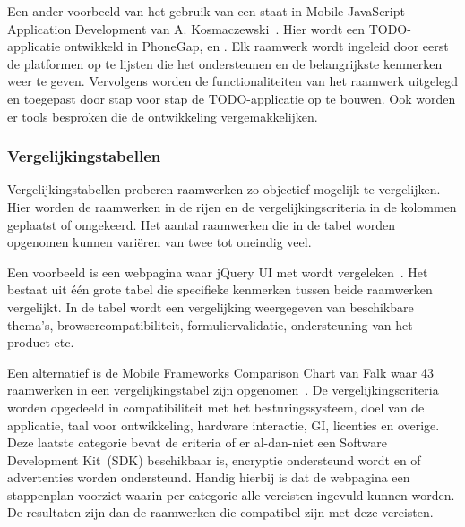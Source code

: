 Een ander voorbeeld van het gebruik van een  staat in Mobile JavaScript Application Development van A. Kosmaczewski~\cite{Kosmaczewski2012}.
Hier wordt een TODO-applicatie ontwikkeld in PhoneGap, \st{} en \jqm{}.
Elk raamwerk wordt ingeleid door eerst de platformen op te lijsten die het ondersteunen en de belangrijkste kenmerken weer te geven.
Vervolgens worden de functionaliteiten van het raamwerk uitgelegd en toegepast door stap voor stap de TODO-applicatie op te bouwen.
Ook worden er tools besproken die de ontwikkeling vergemakkelijken.

\subsubsection{Vergelijkingstabellen}
\label{sec:manier-vergelijkingstabellen}
Vergelijkingstabellen proberen raamwerken zo objectief mogelijk te vergelijken.
Hier worden de raamwerken in de rijen en de vergelijkingscriteria in de kolommen geplaatst of omgekeerd.
Het aantal raamwerken die in de tabel worden opgenomen kunnen variëren van twee tot oneindig veel.

Een voorbeeld is een webpagina waar jQuery UI met \kendo{} wordt vergeleken~\cite{Bristowe2012}.
Het bestaat uit één grote tabel die specifieke kenmerken tussen beide raamwerken vergelijkt.
In de tabel wordt een vergelijking weergegeven van beschikbare thema's,  browsercompatibiliteit,  formuliervalidatie,  ondersteuning van het product etc.

Een alternatief is de Mobile Frameworks Comparison Chart van Falk waar 43 raamwerken in een vergelijkingstabel zijn opgenomen~\cite{Falk2011}. 
De vergelijkingscriteria worden opgedeeld in compatibiliteit met het besturingssysteem,  doel van de applicatie,  taal voor ontwikkeling,  hardware interactie,  GI,  licenties en overige.  
Deze laatste categorie bevat de criteria of er al-dan-niet een Software Development Kit~(SDK) beschikbaar is, encryptie ondersteund wordt en of advertenties worden ondersteund.  
Handig hierbij is dat de webpagina een stappenplan voorziet waarin per categorie alle vereisten ingevuld kunnen worden.  
De resultaten zijn dan de raamwerken die compatibel zijn met deze vereisten.


